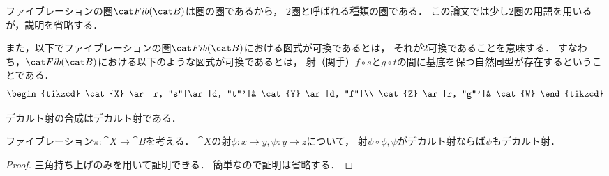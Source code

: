     \begin{Remark}
        ファイブレーションの圏$\Fib{B}$は圏の圏であるから，
        $2$圏と呼ばれる種類の圏である．
        この論文では少し$2$圏の用語を用いるが，説明を省略する．

        また，以下でファイブレーションの圏$\Fib{B}$における図式が可換であるとは，
        それが$2$可換であることを意味する．
        すなわち，$\Fib{B}$における以下のような図式が可換であるとは，
        射（関手）$f \circ s$と$g \circ t$の間に基底を保つ自然同型が存在するということである．
        \[
        \begin{tikzcd}
            \cat{X} \ar[r, "s"]\ar[d, "t"']& \cat{Y} \ar[d, "f"]\\
            \cat{Z} \ar[r, "g"']& \cat{W}
        \end{tikzcd}
        \]
    \end{Remark}

    \begin{Prop}\cite*{Vistoli07}
    \begin{myenum}
    \item
        デカルト射の合成はデカルト射である．
    \item
        ファイブレーション$\pi \colon \cat{X} \to \cat{B}$を考える．
        $\cat{X}$の射$\phi \colon x \to y, \psi \colon y \to z$について，
        射$\psi \circ \phi, \psi$がデカルト射ならば$\psi$もデカルト射．
    \end{myenum}
    \end{Prop}
    \begin{proof}
        三角持ち上げのみを用いて証明できる．
        簡単なので証明は省略する．
    \end{proof}

